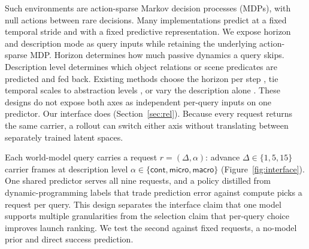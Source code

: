 \begin{revblock}
Such environments are action-sparse Markov decision processes (MDPs), with null actions between rare decisions. Many implementations predict at a fixed temporal stride and with a fixed predictive representation. We expose horizon and description mode as query inputs while retaining the underlying action-sparse MDP. Horizon determines how much passive dynamics a query skips. Description level determines which object relations or scene predicates are predicted and fed back. Existing methods choose the horizon per step \citep{neitz2018adaptive,chatterjee2025improving}, tie temporal scales to abstraction levels \citep{lecun2022path}, or vary the description alone \citep{wang2023dynamic,liang2025visualpredicator}. These designs do not expose both axes as independent per-query inputs on one predictor. Our interface does (Section~\ref{sec:rel}). Because every request returns the same carrier, a rollout can switch either axis without translating between separately trained latent spaces.

Each world-model query carries a request $r=(\Delta,\alpha)$: advance $\Delta\in\{1,5,15\}$ carrier frames at description level $\alpha\in\{\textsf{cont},\textsf{micro},\textsf{macro}\}$ (Figure~\ref{fig:interface}). One shared predictor serves all nine requests, and a policy distilled from dynamic-programming labels that trade prediction error against compute picks a request per query. This design separates the interface claim that one model supports multiple granularities from the selection claim that per-query choice improves launch ranking. We test the second against fixed requests, a no-model prior and direct success prediction.


\end{revblock}
